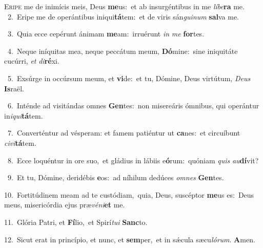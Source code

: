 \lettrine{\initial\textcolor{\initialcolor}{E}}{ripe} me de inimícis meis, Deus \textbf{me}\-us:~\star et ab insurgéntibus in me \textit{lí}\-\textit{be}\textbf{ra} me.\\
{\numbfont\textcolor{\numbcolor}{~2.}}~Eripe me de operántibus iniqui\-\textbf{tá}\-tem:~\star et de viris sán\-\textit{gui}\-\textit{num} \textbf{sal}\-va me.\par
{\numbfont\textcolor{\numbcolor}{~3.}}~Quia ecce cepérunt ánimam \textbf{me}\-am:~\star irruérunt \textit{in} \textit{me} \textbf{for}\-tes.\par
{\numbfont\textcolor{\numbcolor}{~4.}}~Neque iníquitas mea, neque peccátum meum, \textbf{Dó}\-mine:~\star sine iniquitáte cucúrri, \textit{et} \textit{di}\-\textbf{ré}xi.\par
{\numbfont\textcolor{\numbcolor}{~5.}}~Exsúrge in occúrsum meum, et \textbf{vi}\-de:~\star et tu, Dómine, Deus virtútum, \textit{De}\-\textit{us} \textbf{Is}\-raël.\par
{\numbfont\textcolor{\numbcolor}{~6.}}~Inténde ad visitándas omnes \textbf{Gen}\-tes:~\star non misereáris ómnibus, qui operántur in\-\textit{i}\-\textit{qui}\textbf{tá}tem.\par
{\numbfont\textcolor{\numbcolor}{~7.}}~Converténtur ad vésperam: et famem patiéntur ut \textbf{ca}\-nes:~\star et circuíbunt \textit{ci}\-\textit{vi}\textbf{tá}tem.\par
{\numbfont\textcolor{\numbcolor}{~8.}}~Ecce loquéntur in ore suo,~\dagger et gládius in lábiis e\-\textbf{ó}\-rum:~\star quóniam \textit{quis} \textit{au}\-\textbf{dí}vit?\par
{\numbfont\textcolor{\numbcolor}{~9.}}~Et tu, Dómine, deridébis \textbf{e}\-os:~\star ad níhilum dedúces \textit{om}\-\textit{nes} \textbf{Gen}\-tes.\par
{\numbfont\textcolor{\numbcolor}{10.}}~Fortitúdinem meam ad te custódiam,~\dagger quia, Deus, suscéptor \textbf{me}\-us es:~\star Deus meus, misericórdia ejus præ\-\textit{vé}\-\textit{ni}\textbf{et} me.\par
{\numbfont\textcolor{\numbcolor}{11.}}~Glória Patri, et \textbf{Fí}\-lio,~\star et Spirí\-\textit{tu}\-\textit{i} \textbf{Sanc}\-to.\par
{\numbfont\textcolor{\numbcolor}{12.}}~Sicut erat in princípio, et nunc, et \textbf{sem}\-per,~\star et in sǽcula sæcu\-\textit{ló}\-\textit{rum}. \textbf{A}\-men.\par
